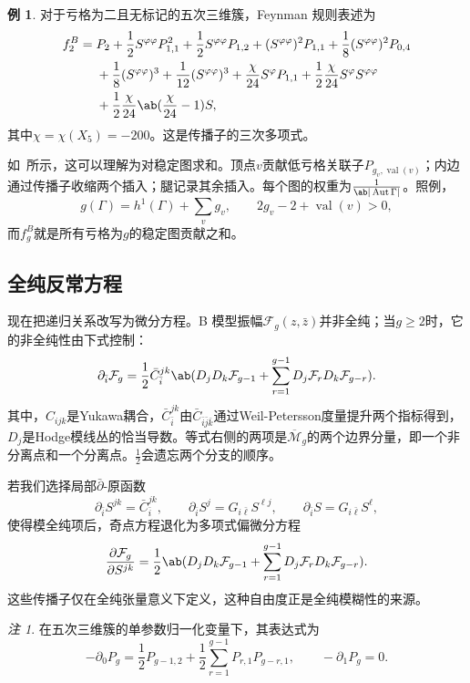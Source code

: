 \documentclass{amsart}
\theoremstyle{definition}
\newtheorem{exm}[thm]{例}
\theoremstyle{remark}
\newtheorem{rmk}[thm]{注}
\theoremstyle{plain}
\theoremstyle{definition}
\theoremstyle{remark}
\newcommand{\Mbar}{\overline{\mathcal{M}}}
\newcommand{\mc}[1]{\mathcal{#1}}
\newcommand{\on}[1]{\operatorname{#1}}
\newcommand{\1}{\mathbf{1}}
\newcommand{\2}{\mathbf{2}}
\newcommand{\3}{\mathbf{3}}
\DeclareMathOperator{\Aut}{Aut}
\begin{document}
\begin{exm}
    对于亏格为二且无标记的五次三维簇，Feynman 规则表述为
    \begin{align*}
        f_2^B ={}& P_2 + \frac{1}{2}S^{\varphi\varphi}P_{1,1}^2 + \frac{1}{2}S^{\varphi\varphi}P_{1,2} + (S^{\varphi\varphi})^2 P_{1,1} + \frac{1}{8}(S^{\varphi\varphi})^2 P_{0,4} \\
        &+ \frac{1}{8}(S^{\varphi\varphi})^3 + \frac{1}{12}(S^{\varphi\varphi})^3 + \frac{\chi}{24}S^{\varphi}P_{1,1} + \frac{1}{2}\frac{\chi}{24}S^{\varphi}S^{\varphi\varphi} \\
        &+ \frac{1}{2}\frac{\chi}{24}\ab(\frac{\chi}{24}-1)S,
    \end{align*}
其中\(\chi = \chi(X_5) = -200\)。这是传播子的三次多项式。
\end{exm}

如~所示，这可以理解为对稳定图求和。顶点\(v\)贡献低亏格关联子\(P_{g_v, \on{val}(v)}\)；内边通过传播子收缩两个插入；腿记录其余插入。每个图的权重为\(\frac{1}{\ab|\Aut \Gamma|}\)。照例，
\[ g(\Gamma) = h^1(\Gamma) + \sum_v g_v, \qquad 2g_v - 2 + \on{val}(v) > 0, \]
而\(f_g^B\)就是所有亏格为\(g\)的稳定图贡献之和。

\subsection{全纯反常方程}%
\label{sub:The holomorphic anomaly equation}

现在把递归关系改写为微分方程。B 模型振幅\(\mc{F}_g(z,\bar{z})\)并非全纯；当\(g \geq 2\)时，它的非全纯性由下式控制：
\[ \partial_{\bar{i}} \mc{F}_g = \frac{1}{2}\bar{C}_{\bar{i}}^{jk}\ab( D_j D_k \mc{F}_{g-1} + \sum_{r=1}^{g-1} D_j \mc{F}_r D_k \mc{F}_{g-r} ). \]
其中，\(C_{ijk}\)是Yukawa耦合，\(\bar{C}_{\bar{i}}^{jk}\)由\(\bar{C}_{\bar{i}\bar{j}\bar{k}}\)通过Weil-Petersson度量提升两个指标得到，\(D_j\)是Hodge模线丛的恰当导数。等式右侧的两项是\(\Mbar_g\)的两个边界分量，即一个非分离点和一个分离点。\(\frac{1}{2}\)会遗忘两个分支的顺序。

若我们选择局部\(\bar{\partial}\)-原函数
\[ \partial_{\bar{i}}S^{jk} = \bar{C}_{\bar{i}}^{jk}, \qquad \partial_{\bar{i}}S^j = G_{i\bar{\ell}}S^{\ell j}, \qquad \partial_{\bar{i}}S = G_{i\bar{\ell}}S^{\ell}, \]
使得模全纯项后，奇点方程退化为多项式偏微分方程
\[ \pdv{\mc{F}_g}{S^{jk}} = \frac{1}{2}\ab( D_jD_k \mc{F}_{g-1} + \sum_{r=1}^{g-1} D_j \mc{F}_r D_k \mc{F}_{g-r} ). \]
这些传播子仅在全纯张量意义下定义，这种自由度正是全纯模糊性的来源。

\begin{rmk}
在五次三维簇的单参数归一化变量下，其表达式为
    \[ -\partial_0 P_g = \frac{1}{2}P_{g-1,2} + \frac{1}{2}\sum_{r=1}^{g-1}P_{r,1}P_{g-r,1}, \qquad -\partial_1 P_g = 0. \]
\end{rmk}
\end{document}
